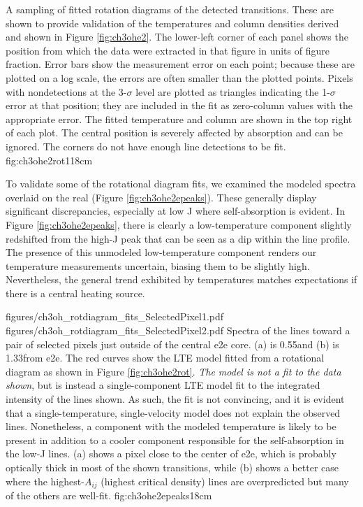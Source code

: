 \documentclass[twocolumn]{aastex61}
\begin{document}
{A sampling of fitted rotation diagrams of the detected \methanol transitions.
These are shown to provide validation of the temperatures and column densities
derived and shown in Figure \ref{fig:ch3ohe2}.  The lower-left corner of each
panel shows the position from which the data were extracted in that figure in
units of figure fraction.  Error bars show the measurement error on each point;
because these are plotted on a log scale, the errors are often smaller than
the plotted points.  Pixels with nondetections at the 3-$\sigma$ level are plotted
as triangles indicating the 1-$\sigma$ error at that position; they are included
in the fit as zero-column values with the appropriate error.  The fitted
temperature and column are shown in the top right of each plot.
The central position is severely affected by absorption and can be ignored.
The corners do not have enough line detections to be fit.
}{fig:ch3ohe2rot}{1}{18cm}



To validate some of the rotational diagram fits, we examined the modeled
spectra overlaid on the real (Figure \ref{fig:ch3ohe2epeaks}).  These generally
display significant discrepancies, especially at low J where self-absorption is
evident.  In Figure \ref{fig:ch3ohe2epeaks}, there is clearly a low-temperature
component slightly redshifted from the high-J peak that can be seen as a dip
within the line profile.  The presence of this unmodeled low-temperature
component renders our \methanol temperature measurements uncertain, biasing
them to be slightly high.  Nevertheless,
the general trend exhibited by \methanol temperatures matches expectations
if there is a central heating source.  



\FigureTwo
{figures/ch3oh_rotdiagram_fits_SelectedPixel1.pdf}
{figures/ch3oh_rotdiagram_fits_SelectedPixel2.pdf}
{Spectra of the \methanol lines toward a pair of selected pixels just outside
of the central e2e core. (a) is 0.55\arcsec  and (b) is 1.33\arcsec from e2e.  The red
curves show the LTE model fitted from a rotational diagram as shown in Figure
\ref{fig:ch3ohe2rot}.  \emph{The model is not a fit to the data shown}, but is instead
a single-component LTE model fit to the integrated intensity of the lines
shown.  As such, the fit is not convincing, and it is evident that a
single-temperature, single-velocity model does not explain the observed lines.
Nonetheless, a component with the modeled temperature is likely to be present
in addition to a cooler component responsible for the self-absorption in the
low-J lines.  (a) shows a pixel close to the center of e2e, which is probably
optically thick in most of the shown transitions, while (b) shows a better case
where the highest-$A_{ij}$ (highest critical density) lines are overpredicted
but many of the others are well-fit.}
{fig:ch3ohe2epeaks}{1}{8cm}
\end{document}
